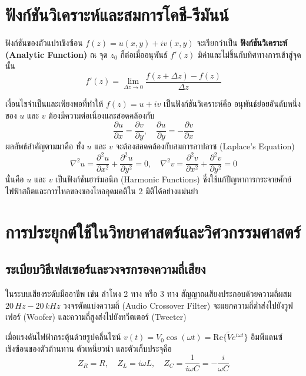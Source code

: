 \section{ฟังก์ชันวิเคราะห์และสมการโคชี-รีมันน์}
ฟังก์ชันของตัวแปรเชิงซ้อน $f(z) = u(x,y) + i v(x,y)$ จะเรียกว่าเป็น \textbf{ฟังก์ชันวิเคราะห์ (Analytic Function)} ณ จุด $z_0$ ก็ต่อเมื่ออนุพันธ์ $f'(z)$ มีค่าและไม่ขึ้นกับทิศทางการเข้าสู่จุดนั้น
\begin{equation}
f'(z) = \lim_{\Delta z \to 0} \frac{f(z + \Delta z) - f(z)}{\Delta z}
\end{equation}

\begin{maththeorem}
เงื่อนไขจำเป็นและเพียงพอที่ทำให้ $f(z) = u + iv$ เป็นฟังก์ชันวิเคราะห์คือ อนุพันธ์ย่อยอันดับหนึ่งของ $u$ และ $v$ ต้องมีความต่อเนื่องและสอดคล้องกับ
\begin{equation}
\frac{\partial u}{\partial x} = \frac{\partial v}{\partial y}, \quad \frac{\partial u}{\partial y} = -\frac{\partial v}{\partial x}
\end{equation}
ผลลัพธ์สำคัญตามมาคือ ทั้ง $u$ และ $v$ จะต้องสอดคล้องกับสมการลาปลาซ (Laplace's Equation)
\begin{equation}
\nabla^2 u = \frac{\partial^2 u}{\partial x^2} + \frac{\partial^2 u}{\partial y^2} = 0, \quad \nabla^2 v = \frac{\partial^2 v}{\partial x^2} + \frac{\partial^2 v}{\partial y^2} = 0
\end{equation}
นั่นคือ $u$ และ $v$ เป็นฟังก์ชันฮาร์มอนิก (Harmonic Functions) ซึ่งใช้แก้ปัญหาการกระจายศักย์ไฟฟ้าสถิตและการไหลของของไหลอุดมคติใน 2 มิติได้อย่างแม่นยำ
\end{maththeorem}

\section{การประยุกต์ใช้ในวิทยาศาสตร์และวิศวกรรมศาสตร์}
\subsection{ระเบียบวิธีเฟสเซอร์และวงจรกรองความถี่เสียง}
ในระบบเสียงระดับมืออาชีพ เช่น ลำโพง 2 ทาง หรือ 3 ทาง สัญญาณเสียงประกอบด้วยความถี่ผสม $20\,\si{Hz} - 20\,\si{kHz}$ วงจรตัดแบ่งความถี่ (Audio Crossover Filter) จะแยกความถี่ต่ำส่งไปยังวูฟเฟอร์ (Woofer) และความถี่สูงส่งไปยังทวีตเตอร์ (Tweeter)

เมื่อแรงดันไฟฟ้ากระตุ้นด้วยรูปคลื่นไซน์ $v(t) = V_0 \cos(\omega t) = \text{Re}\{\tilde{V} e^{i\omega t}\}$ อิมพีแดนซ์เชิงซ้อนของตัวต้านทาน ตัวเหนี่ยวนำ และตัวเก็บประจุคือ
\begin{equation}
Z_R = R, \quad Z_L = i\omega L, \quad Z_C = \frac{1}{i\omega C} = -\frac{i}{\omega C}
\end{equation}


